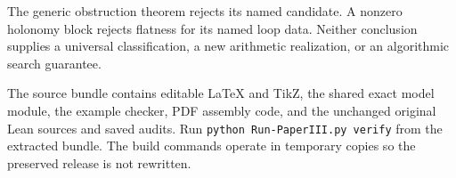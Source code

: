 The generic obstruction theorem rejects its named candidate. A nonzero holonomy block rejects flatness for its named loop data. Neither conclusion supplies a universal classification, a new arithmetic realization, or an algorithmic search guarantee.

The source bundle contains editable LaTeX and TikZ, the shared exact model module, the example checker, PDF assembly code, and the unchanged original Lean sources and saved audits. Run \texttt{python Run-PaperIII.py verify} from the extracted bundle. The build commands operate in temporary copies so the preserved release is not rewritten.

